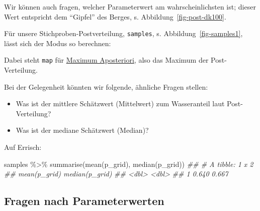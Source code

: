 \documentclass[
  a4paper,
  DIV=11]{scrreprt}
\newenvironment{Shaded}{\begin{snugshade}}{\end{snugshade}}
\newcommand{\DocumentationTok}[1]{\textcolor[rgb]{0.37,0.37,0.37}{\textit{#1}}}
\newcommand{\FunctionTok}[1]{\textcolor[rgb]{0.28,0.35,0.67}{#1}}
\newcommand{\NormalTok}[1]{\textcolor[rgb]{0.00,0.23,0.31}{#1}}
\newcommand{\SpecialCharTok}[1]{\textcolor[rgb]{0.37,0.37,0.37}{#1}}
\providecommand{\tightlist}{%
  \setlength{\itemsep}{0pt}\setlength{\parskip}{0pt}}\usepackage{longtable,booktabs,array}
\theoremstyle{definition}
\theoremstyle{remark}
\begin{document}
Wir können auch fragen, welcher Parameterwert am wahrscheinlichsten ist;
dieser Wert entspricht dem ``Gipfel'' des Berges, s.
Abbildung~\ref{fig-post-dk100}.

Für unsere Stichproben-Postverteilung, \texttt{samples}, s.
Abbildung~\ref{fig-samples1}, lässt sich der Modus so berechnen:

\begin{Shaded}
\end{Shaded}

Dabei steht \texttt{map} für
\href{https://easystats.github.io/bayestestR/reference/map_estimate.html}{Maximum
Aposteriori}, also das Maximum der Post-Verteilung.

Bei der Gelegenheit könnten wir folgende, ähnliche Fragen stellen:

\begin{itemize}
\tightlist
\item
  Was ist der mittlere Schätzwert (Mittelwert) zum Wasseranteil laut
  Post-Verteilung?
\item
  Was ist der mediane Schätzwert (Median)?
\end{itemize}

Auf Errisch:

\begin{Shaded}
\begin{Highlighting}[]
\NormalTok{samples }\SpecialCharTok{\%\textgreater{}\%} 
  \FunctionTok{summarise}\NormalTok{(}\FunctionTok{mean}\NormalTok{(p\_grid),}
            \FunctionTok{median}\NormalTok{(p\_grid))}
\DocumentationTok{\#\# \# A tibble: 1 x 2}
\DocumentationTok{\#\#   \textasciigrave{}mean(p\_grid)\textasciigrave{} \textasciigrave{}median(p\_grid)\textasciigrave{}}
\DocumentationTok{\#\#            \textless{}dbl\textgreater{}            \textless{}dbl\textgreater{}}
\DocumentationTok{\#\# 1          0.640            0.667}
\end{Highlighting}
\end{Shaded}

\hypertarget{fragen-nach-parameterwerten}{%
\subsection{Fragen nach
Parameterwerten}\label{fragen-nach-parameterwerten}}
\end{document}
